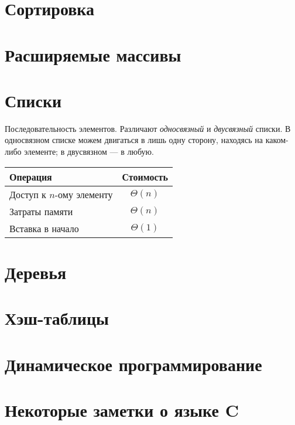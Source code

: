 \section{Сортировка}
\label{sec:sorting}

\section{Расширяемые массивы}
\label{sec:ext-arrays}

\section{Списки}
\label{sec:lists}

Последовательность элементов. Различают \emph{односвязный} и \emph{двусвязный} списки. В односвязном списке можем двигаться в лишь одну сторону, находясь на каком-либо элементе; в двусвязном --- в любую.
\begin{center}
  \begin{tabular}{lc}
    \toprule
    Операция & Стоимость \\
    \midrule
    Доступ к $n$-ому элементу & $\Theta(n)$ \\
    Затраты памяти & $\Theta(n)$ \\
    Вставка в начало & $\Theta(1)$ \\
    \bottomrule
  \end{tabular}
\end{center}

\section{Деревья}
\label{sec:trees}

\section{Хэш-таблицы}
\label{sec:hash-tables}

\section{Динамическое программирование}
\label{sec:dyn-programming}

\section{Некоторые заметки о языке C}
\label{sec:c-notes}
